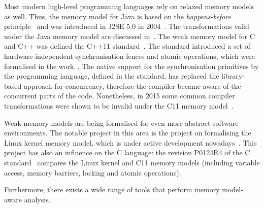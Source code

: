 Most modern high-level programming languages rely on relaxed memory models as well.
Thus, the memory model for Java is based on the \textit{happens-before} principle~\cite{lamport1978time} and was introduced in J2SE 5.0 in 2004~\cite{manson2005java}.
The transformations valid under the Java memory model are discussed in~\cite{sevcik2009program}.
The weak memory model for C and C++ was defined the C++11 standard~\cite{c11}.
The standard introduced a set of hardware-independent synchronisation fences and atomic operations, which were formalised in the work~\cite{batty2011mathematizing}.
The native support for the synchronisation primitives by the programming language, defined in the standard, has replaced the library-based approach for concurrency, therefore the compiler became aware of the concurrent parts of the code.
Nonetheless, in 2015 some common compiler transformations were shown to be invalid under the C11 memory model~\cite{vafeiadis2015common}.

Weak memory models are being formalised for even more abstract software environments.
The notable project in this area is the project on formalising the Linux kernel memory model, which is under active development nowadays~\cite{alglave2018frightening, kernel1, mckenney2017wg21}.
This project has also an influence on the C language: the revision P0124R4 of the C standard~\cite{kernel2c} compares the Linux kernel and C11 memory models (including variable access, memory barriers, locking and atomic operations).


Furthermore, there exists a wide range of tools that perform memory model-aware analysis.

